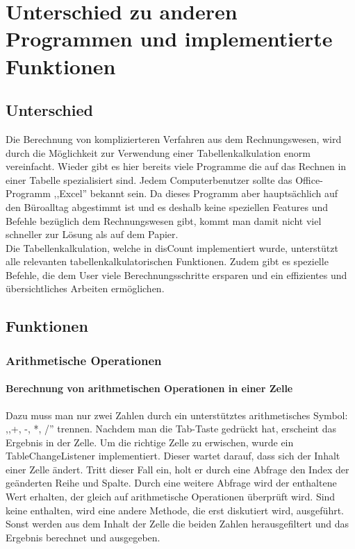 \documentclass[12pt]{report}
\begin{document}
\chapter{Unterschied zu anderen Programmen und implementierte Funktionen}
 
\section{Unterschied}
Die Berechnung von komplizierteren Verfahren aus dem Rechnungswesen, wird durch die Möglichkeit zur Verwendung einer Tabellenkalkulation enorm vereinfacht. Wieder gibt es hier bereits viele Programme die auf das Rechnen in einer Tabelle spezialisiert sind. Jedem Computerbenutzer sollte das Office-Programm ,,Excel'' bekannt sein. Da dieses Programm aber hauptsächlich auf den Büroalltag abgestimmt ist und es deshalb keine speziellen Features und Befehle bezüglich dem Rechnungswesen gibt, kommt man damit nicht viel schneller zur Lösung als auf dem Papier.\\
Die Tabellenkalkulation, welche in disCount implementiert wurde, unterstützt alle relevanten tabellenkalkulatorischen Funktionen. Zudem gibt es spezielle Befehle, die dem User viele Berechnungsschritte ersparen und ein effizientes und übersichtliches Arbeiten ermöglichen.



\section{Funktionen}

\subsection{Arithmetische Operationen}



\subsubsection{Berechnung von arithmetischen Operationen in einer Zelle}
Dazu muss man nur zwei Zahlen durch ein unterstütztes arithmetisches Symbol: ,,+, -, *, /'' trennen. Nachdem man die Tab-Taste gedrückt hat, erscheint das Ergebnis in der Zelle. Um die richtige Zelle zu erwischen, wurde ein TableChangeListener implementiert. Dieser wartet darauf, dass sich der Inhalt einer Zelle ändert. Tritt dieser Fall ein, holt er durch eine Abfrage den Index der geänderten Reihe und Spalte. Durch eine weitere Abfrage wird der enthaltene Wert erhalten, der gleich auf arithmetische Operationen überprüft wird. Sind keine enthalten, wird eine andere Methode, die erst diskutiert wird, ausgeführt. Sonst werden aus dem Inhalt der Zelle die beiden Zahlen herausgefiltert und das Ergebnis berechnet und ausgegeben.
\end{document}
